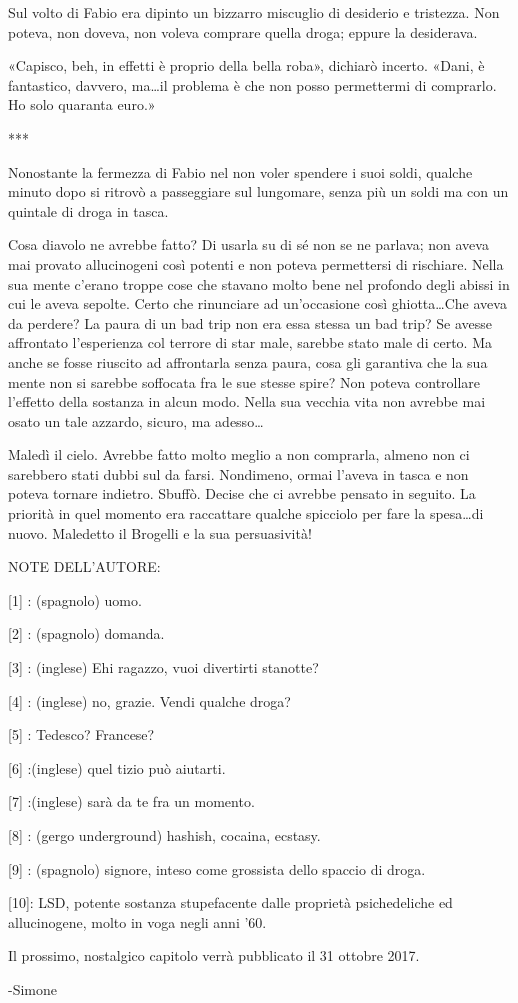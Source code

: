Sul volto di Fabio era dipinto un bizzarro miscuglio di desiderio e tristezza. Non poteva, non doveva, non voleva comprare quella droga; eppure la desiderava.

«Capisco, beh, in effetti è proprio della bella roba», dichiarò incerto. «Dani, è fantastico, davvero, ma\ldots il problema è che non posso permettermi di comprarlo. Ho solo quaranta euro.»

***

Nonostante la fermezza di Fabio nel non voler spendere i suoi soldi, qualche minuto dopo si ritrovò a passeggiare sul lungomare, senza più un soldi ma con un quintale di droga in tasca.

Cosa diavolo ne avrebbe fatto? Di usarla su di sé non se ne parlava; non aveva mai provato allucinogeni così potenti e non poteva permettersi di rischiare. Nella sua mente c'erano troppe cose che stavano molto bene nel profondo degli abissi in cui le aveva sepolte. Certo che rinunciare ad un'occasione così ghiotta\ldots Che aveva da perdere? La paura di un bad trip non era essa stessa un bad trip? Se avesse affrontato l'esperienza col terrore di star male, sarebbe stato male di certo. Ma anche se fosse riuscito ad affrontarla senza paura, cosa gli garantiva che la sua mente non si sarebbe soffocata fra le sue stesse spire? Non poteva controllare l'effetto della sostanza in alcun modo. Nella sua vecchia vita non avrebbe mai osato un tale azzardo, sicuro, ma adesso\ldots

Maledì il cielo. Avrebbe fatto molto meglio a non comprarla, almeno non ci sarebbero stati dubbi sul da farsi. Nondimeno, ormai l'aveva in tasca e non poteva tornare indietro. Sbuffò. Decise che ci avrebbe pensato in seguito. La priorità in quel momento era raccattare qualche spicciolo per fare la spesa\ldots di nuovo. Maledetto il Brogelli e la sua persuasività!


NOTE DELL'AUTORE:

[1] : (spagnolo) uomo.

[2] : (spagnolo) domanda.

[3] : (inglese) Ehi ragazzo, vuoi divertirti stanotte?

[4] : (inglese) no, grazie. Vendi qualche droga?

[5] : Tedesco? Francese?

[6] :(inglese) quel tizio può aiutarti.

[7] :(inglese) sarà da te fra un momento.

[8] : (gergo underground) hashish, cocaina, ecstasy. 

[9] : (spagnolo) signore, inteso come grossista dello spaccio di droga.

[10]: LSD, potente sostanza stupefacente dalle proprietà psichedeliche ed allucinogene, molto in voga negli anni '60.


Il prossimo, nostalgico capitolo verrà pubblicato il 31 ottobre 2017.

-Simone



